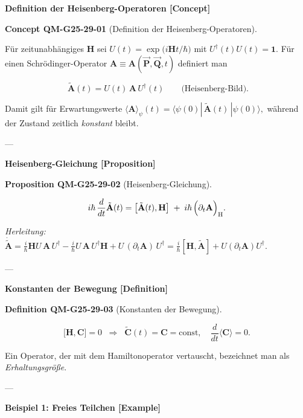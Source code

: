 \documentclass[10pt, letterpaper]{article}
\newcommand{\CustomHeading}[3]{%
  \par\medskip\noindent%
  \textbf{#1 #2} \textnormal{(#3)}.\enskip%
}
\newenvironment{DEF}[2]{\begin{unitbox}\CustomHeading{Definition}{#1}{#2}}{\end{unitbox}}
\newenvironment{PROP}[2]{\begin{unitbox}\CustomHeading{Proposition}{#1}{#2}}{\end{unitbox}}
\newenvironment{CONC}[2]{\begin{unitbox}\CustomHeading{Concept}{#1}{#2}}{\end{unitbox}}
\begin{document}

\textbf{Definition der Heisenberg-Operatoren [Concept]}

\begin{CONC}{QM-G25-29-01}{Definition der Heisenberg-Operatoren}
Für zeitunabhängiges $\mathbf H$ sei  
\(
U(t)=\exp\!\bigl(i\mathbf H t/\hbar\bigr)
\)
mit $U^\dagger(t)U(t)=\mathbf 1$.  
Für einen Schrödinger-Operator $\mathbf A\equiv\mathbf A(\vec{\mathbf P},\vec{\mathbf Q},t)$ definiert man

\[
\boxed{\;
\tilde{\mathbf A}(t)
=U(t)\,\mathbf A\,U^\dagger(t)}
\qquad\bigl(\text{Heisenberg-Bild}\bigr).
\]

Damit gilt für Erwartungswerte
\(
\langle\mathbf A\rangle_{\psi}(t)
=\langle\psi(0)|\,\tilde{\mathbf A}(t)\,|\psi(0)\rangle,
\)
während der Zustand zeitlich \emph{konstant} bleibt.
\end{CONC}

---

\textbf{Heisenberg-Gleichung [Proposition]}

\begin{PROP}{QM-G25-29-02}{Heisenberg-Gleichung}
\[
i\hbar\,\frac{d}{dt}\tilde{\mathbf A}(t)
=
\bigl[\tilde{\mathbf A}(t),\mathbf H\bigr]
\;+\;i\hbar\,
\Bigl(\partial_t\mathbf A\Bigr)_{\text{H}}.
\]

\emph{Herleitung:}
\(
\dot{\tilde{\mathbf A}}
= \tfrac{i}{\hbar}\mathbf H U\,\mathbf A\,U^\dagger
      -\tfrac{i}{\hbar}U\,\mathbf A\,U^\dagger\mathbf H
      +U\,(\partial_t\mathbf A)\,U^\dagger
= \tfrac{i}{\hbar}[\mathbf H,\tilde{\mathbf A}]
      +U(\partial_t\mathbf A)U^\dagger.
\)
\end{PROP}

---

\textbf{Konstanten der Bewegung [Definition]}

\begin{DEF}{QM-G25-29-03}{Konstanten der Bewegung}
\[
\bigl[\mathbf H,\mathbf C\bigr]=0
\;\;\Longrightarrow\;\;
\tilde{\mathbf C}(t)=\mathbf C=\text{const},
\quad
\frac{d}{dt}\langle\mathbf C\rangle=0.
\]

Ein Operator, der mit dem Hamiltonoperator vertauscht, bezeichnet man als \emph{Erhaltungsgröße}.
\end{DEF}

---

\textbf{Beispiel 1: Freies Teilchen [Example]}
\end{document}
